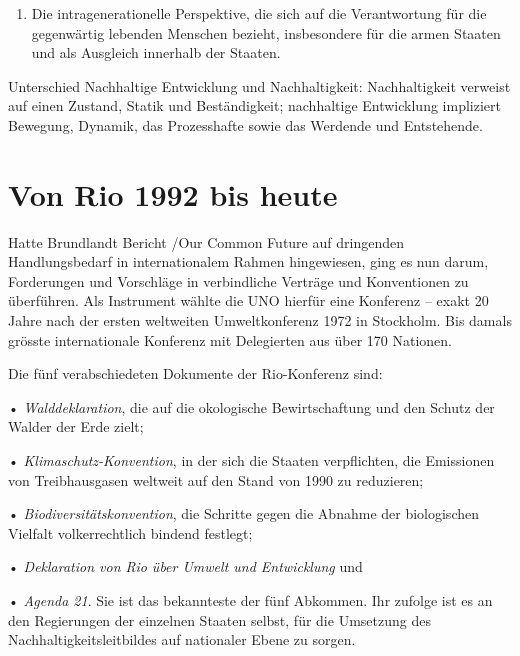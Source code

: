 \documentclass[
]{book}
\providecommand{\tightlist}{%
  \setlength{\itemsep}{0pt}\setlength{\parskip}{0pt}}
\begin{document}
\begin{enumerate}
\def\labelenumi{\arabic{enumi}.}
\setcounter{enumi}{1}
\tightlist
\item
  Die intragenerationelle Perspektive, die sich auf die Verantwortung für die gegenwärtig lebenden Menschen bezieht, insbesondere für die armen Staaten und als Ausgleich innerhalb der Staaten.
\end{enumerate}

\begin{defbox}
Unterschied Nachhaltige Entwicklung und Nachhaltigkeit:
Nachhaltigkeit verweist auf einen Zustand, Statik und Beständigkeit; nachhaltige Entwicklung impliziert Bewegung, Dynamik, das Prozesshafte sowie das Werdende und Entstehende.

\end{defbox}

\hypertarget{von-rio-1992-bis-heute}{%
\section{Von Rio 1992 bis heute}\label{von-rio-1992-bis-heute}}

Hatte Brundlandt Bericht /Our Common Future auf dringenden Handlungsbedarf in internationalem Rahmen hingewiesen, ging es nun darum, Forderungen und Vorschläge in verbindliche Verträge und Konventionen zu überführen. Als Instrument wählte die UNO hierfür eine Konferenz -- exakt 20 Jahre nach der ersten weltweiten Umweltkonferenz 1972 in Stockholm. Bis damals grösste internationale Konferenz mit Delegierten aus über 170 Nationen.

\begin{factbox}
Die fünf verabschiedeten Dokumente der Rio-Konferenz sind:

• \emph{Walddeklaration}, die auf die okologische Bewirtschaftung und den Schutz der
Walder der Erde zielt;

• \emph{Klimaschutz-Konvention}, in der sich die Staaten verpflichten, die Emissionen
von Treibhausgasen weltweit auf den Stand von 1990 zu reduzieren;

• \emph{Biodiversitätskonvention}, die Schritte gegen die Abnahme der biologischen
Vielfalt volkerrechtlich bindend festlegt;

• \emph{Deklaration von Rio über Umwelt und Entwicklung} und

• \emph{Agenda 21}. Sie ist das bekannteste der fünf Abkommen. Ihr zufolge ist es an den Regierungen der einzelnen Staaten selbst, für die Umsetzung des Nachhaltigkeitsleitbildes auf nationaler Ebene zu sorgen.

\end{factbox}
\end{document}
